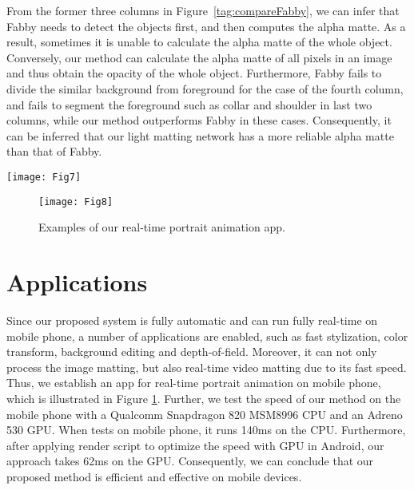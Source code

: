 \documentclass[sigconf]{acmart}
\begin{document}
From the former three columns in Figure~\ref{tag:compareFabby}, we can infer that Fabby needs to detect the objects first, and then computes the alpha matte. As a result, sometimes it is unable to calculate the alpha matte of the whole object. Conversely, our method can calculate the alpha matte of all pixels in an image and thus obtain the opacity of the whole object. Furthermore, Fabby fails to divide the similar background from foreground for the case of the fourth column, and fails to segment the foreground such as collar and shoulder in last two columns, while our method outperforms Fabby in these cases. Consequently, it can be inferred that our light matting network has a more reliable alpha matte than that of Fabby.
\begin{figure*}
\texttt{[image: Fig7]}
\caption{The results between our system and real-time editing app Fabby. \textbf{First row:} The input images. \textbf{Second row:} The results from the app Fabby. \textbf{Third row:} The results from our system.}
\label{tag:compareFabby}
\end{figure*}\begin{figure}
\centering
\texttt{[image: Fig8]}
\caption{Examples of our real-time portrait animation app.}
\label{tag:ourapp}
\end{figure}\section{Applications}
Since our proposed system is fully automatic and can run fully real-time on mobile phone, a number of applications are enabled, such as fast stylization, color transform, background editing and depth-of-field. Moreover, it can not only process the image matting, but also real-time video matting due to its fast speed. Thus, we establish an app for real-time portrait animation on mobile phone, which is illustrated in Figure \ref{tag:ourapp}. Further, we test the speed of our method on the mobile phone with a Qualcomm Snapdragon 820 MSM8996 CPU and an Adreno 530 GPU. When tests on mobile phone, it runs 140ms on the CPU. Furthermore, after applying render script \cite{cnndroid2016} to optimize the speed with GPU in Android, our approach takes 62ms on the GPU. Consequently, we can conclude that our proposed method is efficient and effective on mobile devices.
\end{document}
